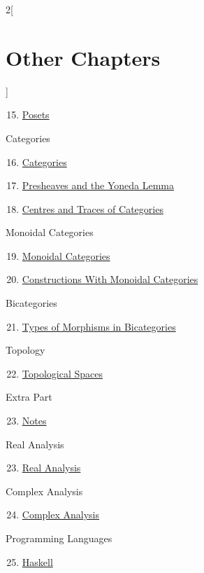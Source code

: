 \begin{multicols}{2}[\section{Other Chapters}]
\begin{enumerate}
\setcounter{enumi}{14}
\item \hyperref[posets:section-phantom]{Posets}
\end{enumerate}
Categories
\begin{enumerate}
\setcounter{enumi}{15}
\item \hyperref[categories:section-phantom]{Categories}
\item \hyperref[presheaves-and-the-yoneda-lemma:section-phantom]{Presheaves and the Yoneda Lemma}
\item \hyperref[centres-and-traces-of-categories:section-phantom]{Centres and Traces of Categories}
\end{enumerate}
Monoidal Categories
\begin{enumerate}
\setcounter{enumi}{18}
\item \hyperref[monoidal-categories:section-phantom]{Monoidal Categories}
\item \hyperref[constructions-with-monoidal-categories:section-phantom]{Constructions With Monoidal Categories}
\end{enumerate}
Bicategories
\begin{enumerate}
\setcounter{enumi}{20}
\item \hyperref[types-of-morphisms-in-bicategories:section-phantom]{Types of Morphisms in Bicategories}
\end{enumerate}
Topology
\begin{enumerate}
\setcounter{enumi}{21}
\item \hyperref[topological-spaces:section-phantom]{Topological Spaces}
\end{enumerate}
Extra Part
\begin{enumerate}
\setcounter{enumi}{22}
\item \hyperref[notes:section-phantom]{Notes}
\end{enumerate}
Real Analysis
\begin{enumerate}
\setcounter{enumi}{22}
\item \hyperref[real-analysis:section-phantom]{Real Analysis}
\end{enumerate}
Complex Analysis
\begin{enumerate}
\setcounter{enumi}{23}
\item \hyperref[complex-analysis:section-phantom]{Complex Analysis}
\end{enumerate}
Programming Languages
\begin{enumerate}
\setcounter{enumi}{24}
\item \hyperref[haskell:section-phantom]{Haskell}
\end{enumerate}
\end{multicols}
